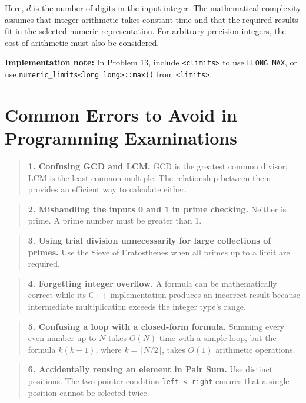 Here, $d$ is the number of digits in the input integer. The mathematical complexity assumes that integer arithmetic takes constant time and that the required results fit in the selected numeric representation. For arbitrary-precision integers, the cost of arithmetic must also be considered.

\textbf{Implementation note:} In Problem 13, include \texttt{<climits>} to use \texttt{LLONG\_MAX}, or use \texttt{numeric\_limits<long long>::max()} from \texttt{<limits>}.


\section{Common Errors to Avoid in Programming Examinations}


\begin{quote}
\textbf{1. Confusing GCD and LCM.}  GCD is the greatest common divisor; LCM is the least common multiple. The relationship between them provides an efficient way to calculate either.
\end{quote}

\begin{quote}
\textbf{2. Mishandling the inputs 0 and 1 in prime checking.}  Neither is prime. A prime number must be greater than 1.
\end{quote}

\begin{quote}
\textbf{3. Using trial division unnecessarily for large collections of primes.}  Use the Sieve of Eratosthenes when all primes up to a limit are required.
\end{quote}

\begin{quote}
\textbf{4. Forgetting integer overflow.}  A formula can be mathematically correct while its C++ implementation produces an incorrect result because intermediate multiplication exceeds the integer type's range.
\end{quote}

\begin{quote}
\textbf{5. Confusing a loop with a closed-form formula.}  Summing every even number up to $N$ takes $O(N)$ time with a simple loop, but the formula $k(k+1)$, where $k=\lfloor N/2\rfloor$, takes $O(1)$ arithmetic operations.
\end{quote}

\begin{quote}
\textbf{6. Accidentally reusing an element in Pair Sum.}  Use distinct positions. The two-pointer condition \texttt{left < right} ensures that a single position cannot be selected twice.
\end{quote}

